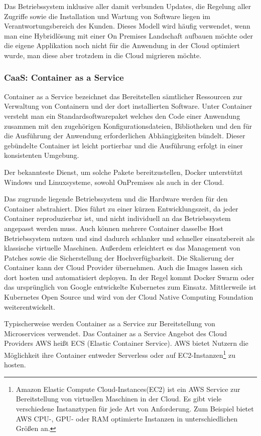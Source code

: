    Das Betriebssystem inklusive aller damit verbunden Updates, die Regelung aller Zugriffe sowie die Installation und Wartung von Software liegen im Verantwortungsbereich des Kunden.
   Dieses Modell wird häufig verwendet, wenn man eine Hybridlösung mit einer On Premises Landschaft aufbauen möchte oder die eigene Applikation noch nicht für die Anwendung in der Cloud optimiert wurde, man diese aber trotzdem in die Cloud migrieren möchte.\cite[]{CloudComputingDef}

   \subsubsection{CaaS: Container as a Service}
   Container as a Service bezeichnet das Bereitstellen sämtlicher Ressourcen zur Verwaltung von Containern und der dort installierten Software.
   Unter Container versteht man ein {}\glqq Standardsoftwarepaket\grqq{} welches {}\glqq den Code einer Anwendung zusammen mit den zugehörigen Konfigurationsdateien,
   Bibliotheken und den für die Ausführung der Anwendung erforderlichen Abhängigkeiten\grqq{} bündelt. \cite[]{CaaS}
   Dieser gebündelte Container ist leicht portierbar und die Ausführung erfolgt in einer konsistenten Umgebung.

   Der bekannteste Dienst, um solche Pakete bereitzustellen, Docker unterstützt Windows und Linuxsysteme, sowohl OnPremises als auch in der Cloud.

   Das zugrunde liegende Betriebssystem und die Hardware werden für den Container abstrahiert.
   Dies führt zu einer kürzen Entwicklungszeit, da jeder Container reproduzierbar ist, und nicht individuell an das Betriebssystem angepasst werden muss.
   Auch können mehrere Container dasselbe Host Betriebssystem nutzen und sind dadurch schlanker und schneller einsatzbereit als klassische virtuelle Maschinen.
   Außerdem erleichtert es das Management von Patches sowie die Sicherstellung der Hochverfügbarkeit.
   Die Skalierung der Container kann der Cloud Provider übernehmen. Auch die Images lassen sich dort hosten und automatisiert deployen.
   In der Regel kommt Docker Swarm oder das ursprünglich von Google entwickelte Kubernetes zum Einsatz.
   Mittlerweile ist Kubernetes Open Source und wird von der Cloud Native Computing Foundation weiterentwickelt.

   Typischerweise werden Container as a Service zur Bereitstellung von Microservices verwendet.
   Das Container as a Service Angebot des Cloud Providers AWS heißt ECS (Elastic Container Service).
   AWS bietet Nutzern die Möglichkeit ihre Container entweder Serverless oder auf EC2-Instanzen\footnote{Amazon Elastic Compute Cloud-Instances(EC2) ist ein AWS Service
   zur Bereitstellung von virtuellen Maschinen in der Cloud. Es gibt viele verschiedene Instanztypen für jede Art von Anforderung.
   Zum Beispiel bietet AWS CPU-, GPU- oder RAM optimierte Instanzen in unterschiedlichen Größen an. } zu hosten. \cite[]{AWSECS}

